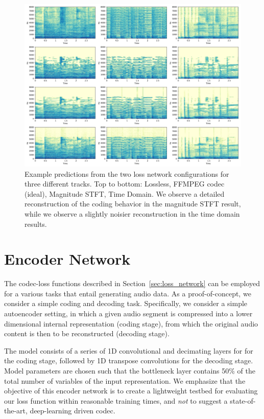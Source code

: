 \documentclass[sigconf]{acmart}
\begin{document}
\begin{figure}[h!]
    \centering
    \includegraphics[width=\textwidth]{loss_network_results.png}
    \caption{Example predictions from the two loss network configurations for three different tracks. Top to bottom: Lossless, FFMPEG codec (ideal), Magnitude STFT, Time Domain.  We observe a detailed reconstruction of the coding behavior in the magnitude STFT result, while we observe a slightly noisier reconstruction in the time domain results.}
    \label{loss-network-grid}
\end{figure}

\section{Encoder Network}

The codec-loss functions described in Section~\ref{sec:loss_network} can be employed for a various tasks that entail generating audio data.  As a proof-of-concept, we consider a simple coding and decoding task.  Specifically, we consider a simple autoencoder setting, in which a given audio segment is compressed into a lower dimensional internal representation (coding stage), from which the original audio content is then to be reconstructed (decoding stage).

The model consists of a series of 1D convolutional and decimating layers for for the coding stage, followed by 1D transpose convolutions for the decoding stage. Model parameters are chosen such that the bottleneck layer contains 50\% of the total number of variables of the input representation. We emphasize that the objective of this encoder network is to create a lightweight testbed for evaluating our loss function within reasonable training times, and \textit{not} to suggest a state-of-the-art, deep-learning driven codec.
\end{document}

